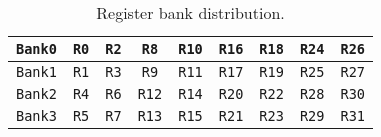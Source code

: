 \begin{table}[htbp]
\caption{Register bank distribution.}
\centering
\scalebox{1.0} {
\begin{tabular}{|c|c|c|c|c|c|c|c|c|}
\hline
    {\tt Bank0}&{\tt R0}&{\tt R2}&{\tt R8}&{\tt R10}&{\tt R16}&{\tt R18}&{\tt R24}&{\tt R26}\\
\hline
    {\tt Bank1}&{\tt R1}&{\tt R3}&{\tt R9}&{\tt R11}&{\tt R17}&{\tt R19}&{\tt R25}&{\tt R27} \\
\hline
    {\tt Bank2}&{\tt R4}&{\tt R6}&{\tt R12}&{\tt R14}&{\tt R20}&{\tt R22}&{\tt R28}&{\tt R30}\\
\hline
    {\tt Bank3}&{\tt R5}&{\tt R7}&{\tt R13}&{\tt R15}&{\tt R21}&{\tt R23}&{\tt R29}&{\tt R31}\\
\hline
\end{tabular}
}
\label{tab:reg}
\end{table}


